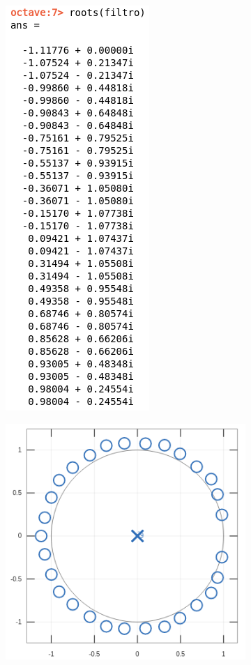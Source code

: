 \documentclass[11pt,a4paper]{article}
\begin{document}
\begin{figure}[H]
\begin{subfigure}{.5\textwidth}
  \centering
  \includegraphics[width=.3\linewidth]{img/polos5.png}
\end{subfigure}%
\begin{subfigure}{.5\textwidth}
  \centering
  \includegraphics[width=1\linewidth]{img/polosg5.png}
\end{subfigure}
\end{figure}
\end{document}
